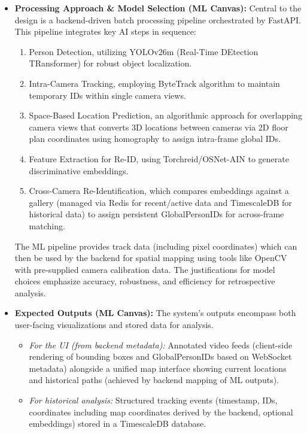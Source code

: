 \begin{itemize}
    \item \textbf{Processing Approach \& Model Selection (ML Canvas):}
        Central to the design is a backend-driven batch processing pipeline orchestrated by FastAPI. This pipeline integrates key AI steps in sequence:
        \begin{enumerate}[label=(\Alph*)]
            \item Person Detection, utilizing YOLOv26m (Real-Time DEtection TRansformer) for robust object localization.
            \item Intra-Camera Tracking, employing ByteTrack algorithm to maintain temporary IDs within single camera views.
            \item Space-Based Location Prediction, an algorithmic approach for overlapping camera views that converts 3D locations between cameras via 2D floor plan coordinates using homography to assign intra-frame global IDs.
            \item Feature Extraction for Re-ID, using Torchreid/OSNet-AIN to generate discriminative embeddings.
            \item Cross-Camera Re-Identification, which compares embeddings against a gallery (managed via Redis for recent/active data and TimescaleDB for historical data) to assign persistent GlobalPersonIDs for across-frame matching.
        \end{enumerate}
        The ML pipeline provides track data (including pixel coordinates) which can then be used by the backend for spatial mapping using tools like OpenCV with pre-supplied camera calibration data. The justifications for model choices emphasize accuracy, robustness, and efficiency for retrospective analysis.

    \item \textbf{Expected Outputs (ML Canvas):}
        The system's outputs encompass both user-facing visualizations and stored data for analysis.
        \begin{itemize}
            \item \textit{For the UI (from backend metadata):} Annotated video feeds (client-side rendering of bounding boxes and GlobalPersonIDs based on WebSocket metadata) alongside a unified map interface showing current locations and historical paths (achieved by backend mapping of ML outputs).
            \item \textit{For historical analysis:} Structured tracking events (timestamp, IDs, coordinates including map coordinates derived by the backend, optional embeddings) stored in a TimescaleDB database.
        \end{itemize}


\end{itemize}
